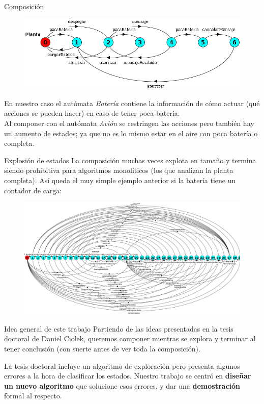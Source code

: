\begin{frame}{Composición}
    \begin{figure}
     \includegraphics[width=\textwidth]{figures/planta.png}
    \end{figure}
    En nuestro caso el autómata \textit{Batería} contiene la información de cómo actuar (qué acciones se pueden hacer) en caso de tener poca batería.\\ 
    Al componer con el autómata \textit{Avión} se restringen las acciones pero también hay un aumento de estados; ya que no es lo mismo estar en el aire con poca batería o completa.
\end{frame}
\begin{frame}{Explosión de estados}
    La composición muchas veces explota en tamaño y termina siendo prohibitiva para algoritmos monolíticos (los que analizan la planta completa). Así queda el muy simple ejemplo anterior si la batería tiene un contador de carga:
    \begin{figure}
    	\includegraphics[width=\textwidth]{figures/big-plant.png}
    \end{figure}
\end{frame}
\begin{frame}{Idea general de este trabajo}
    Partiendo de las ideas presentadas en la tesis doctoral de Daniel Ciolek, queremos componer mientras se explora y terminar al tener conclusión (con suerte antes de ver toda la composición).
    \bigskip
    
    La tesis doctoral incluye un algoritmo de exploración pero presenta algunos errores a la hora de clasificar los estados. Nuestro trabajo se centró en \textbf{diseñar un nuevo algoritmo} que solucione esos errores, y dar una \textbf{demostración} formal al respecto.
    
\end{frame}
